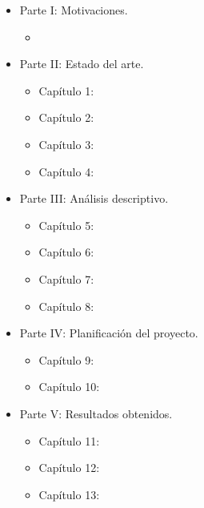 \begin{itemize}
\item Parte I: Motivaciones.
\begin{itemize}
\item
\end{itemize}
\item Parte II: Estado del arte.
\begin{itemize}
\item Capítulo 1:
\item Capítulo 2:
\item Capítulo 3:
\item Capítulo 4:
\end{itemize}
\item Parte III: Análisis descriptivo.
\begin{itemize}
\item Capítulo 5:
\item Capítulo 6:
\item Capítulo 7:
\item Capítulo 8:
\end{itemize}
\item Parte IV: Planificación del proyecto.
\begin{itemize}
\item Capítulo 9:
\item Capítulo 10:
\end{itemize}
\item Parte V: Resultados obtenidos.
\begin{itemize}
\item Capítulo 11:
\item Capítulo 12:
\item Capítulo 13:
\end{itemize}
\end{itemize}